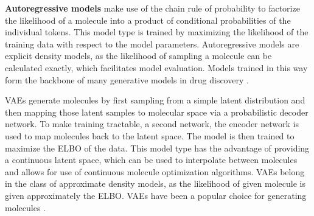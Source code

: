 \textbf{Autoregressive models} make use of the chain rule of probability to factorize the likelihood
of a molecule into a product of conditional probabilities of the individual tokens. This model type
is trained by maximizing the likelihood of the training data with respect to the model parameters.
Autoregressive models are explicit density models, as the likelihood of sampling a molecule can be
calculated exactly, which facilitates model evaluation. Models trained in this way form the backbone
of many generative models in drug discovery
\citep{gomez-bombarelliAutomaticChemicalDesign2018,seglerGeneratingFocusedMolecule2018,olivecronaMolecularDenovoDesign2017,guoAugmentedMemoryCapitalizing2023,thomasAugmentedHillClimbIncreases2022,jaquesSequenceTutorConservative2016,cohen-karlikOvercomingOrderAutoregressive2024}.

\Acp{VAE} \citep{kingmaAutoEncodingVariationalBayes2013} generate molecules by first sampling from a
simple latent distribution and then mapping those latent samples to molecular space via a
probabilistic decoder network. To make training tractable, a second network, the encoder network is
used to map molecules back to the latent space. The model is then trained to maximize the \ac{ELBO}
of the data.
This model type has the advantage of providing a continuous latent space, which can be used to
interpolate between molecules and allows for use of continuous molecule optimization algorithms.
\acp{VAE} belong in the class of approximate density models, as the likelihood of
given molecule is given approximately the \ac{ELBO}. \acp{VAE} have been a
popular choice for generating molecules
\citep{gomez-bombarelliAutomaticChemicalDesign2018,kusnerGrammarVariationalAutoencoder2017,simonovskyGraphVAEGenerationSmall2018,samantaNeVAEDeepGenerative2018,jinJunctionTreeVariational2018,daiSyntaxDirectedVariationalAutoencoder2018,liuConstrainedGraphVariational2018}.

